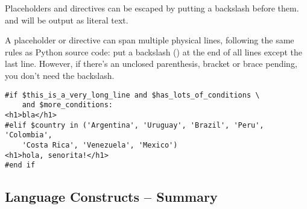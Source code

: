 Placeholders and directives can be escaped by putting a backslash before them.
 and  will be output as literal text.

A placeholder or directive can span multiple physical lines, following the same
rules as Python source code: put a backslash (\code{\\}) at the end of all
lines except the last line.  However, if there's an unclosed parenthesis,
bracket or brace pending, you don't need the backslash.


\begin{verbatim}
#if $this_is_a_very_long_line and $has_lots_of_conditions \
    and $more_conditions:
<h1>bla</h1>
#elif $country in ('Argentina', 'Uruguay', 'Brazil', 'Peru', 'Colombia',
    'Costa Rica', 'Venezuela', 'Mexico')
<h1>hola, senorita!</h1>
#end if
\end{verbatim}
\subsection{Language Constructs -- Summary}
\label{language.constructs}

